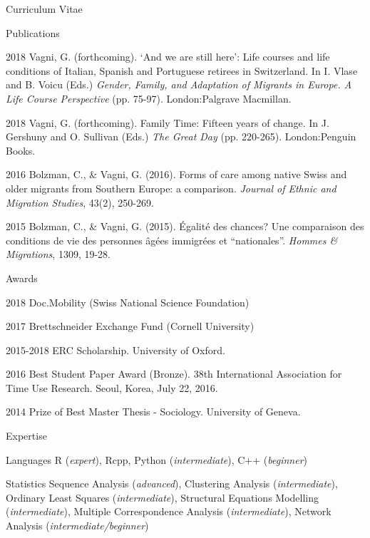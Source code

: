 \documentclass[12pt,a4paper]{article}
\newcommand*{\ac}[1]{\mbox{#1}}
\begin{document}
\begin{cv}{Curriculum Vitae}
 
 \newpage
 
   \begin{cvlist}{Publications}
	
	 \item [2018] Vagni, G. (forthcoming). ‘And we are still here’: Life courses and life conditions of Italian, Spanish and Portuguese retirees in Switzerland. In I. Vlase and B. Voicu (Eds.) \emph{Gender, Family, and Adaptation of Migrants in Europe. A Life Course Perspective} (pp. 75-97). London:Palgrave Macmillan.

   	 \item [2018] Vagni, G. (forthcoming). Family Time: Fifteen years of change. In J. Gershuny and O. Sullivan (Eds.) \emph{The Great Day} (pp. 220-265). London:Penguin Books.  
  
   	\item [2016] Bolzman, C., \& Vagni, G. (2016). Forms of care among native Swiss and older migrants from Southern Europe: a comparison. \emph{Journal of Ethnic and Migration Studies}, 43(2), 250-269.
   	
   	\item [2015]
   	Bolzman, C., \& Vagni, G. (2015). {\'E}galit{\'e} des chances? Une
   	comparaison des conditions de vie des personnes {\^a}g{\'e}es immigr{\'e}es
   	et ``nationales''. \emph{Hommes \& Migrations}, 1309, 19-28.
   \end{cvlist}
 
 
    \begin{cvlist}{Awards}
    	\item[2018]  Doc.Mobility (Swiss National Science Foundation)
    	\item[2017]  Brettschneider Exchange Fund (Cornell University)
    	\item [2015-2018] ERC Scholarship. University of Oxford. 
    	\item [2016]  Best Student Paper Award (Bronze). 38th International Association for Time Use Research. Seoul, Korea, July 22, 2016. 
    	\item [2014] Prize of Best Master Thesis - Sociology.  University of Geneva. 
    \end{cvlist}

  \begin{cvlist}{\ac{Expertise}}
  \item[Languages] R (\emph{expert}), Rcpp, Python (\emph{intermediate}),  C++ (\emph{beginner}) 
  
  \item[Statistics] Sequence Analysis (\emph{advanced}), 
  Clustering Analysis (\emph{intermediate}), 
  Ordinary Least Squares (\emph{intermediate}), Structural Equations Modelling (\emph{intermediate}), Multiple Correspondence Analysis (\emph{intermediate}), 
  Network Analysis (\emph{intermediate/beginner})
  

\end{cvlist}
\end{cv}
\end{document}
